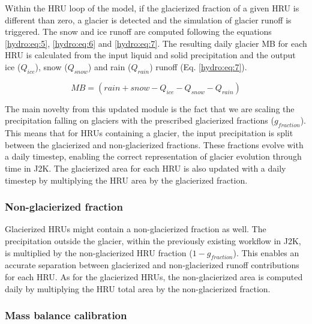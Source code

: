 Within the HRU loop of the model, if the glacierized fraction of a given HRU is different than zero, a glacier is detected and the simulation of glacier runoff is triggered. The snow and ice runoff are computed following the equations \ref{hydro:eq:5}, \ref{hydro:eq:6} and \ref{hydro:eq:7}. The resulting daily glacier MB for each HRU is calculated from the input liquid and solid precipitation and the output ice ($Q_{ice}$), snow ($Q_{snow}$) and rain ($Q_{rain}$) runoff (Eq. \ref{hydro:eq:7}).

\begin{equation} \label{hydro:eq:7}
MB = (rain + snow - Q_{ice} - Q_{snow} - Q_{rain}) 
\end{equation} 

The main novelty from this updated module is the fact that we are scaling the precipitation falling on glaciers with the prescribed glacierized fractions ($g_{fraction}$). This means that for HRUs containing a glacier, the input precipitation is split between the glacierized and non-glacierized fractions. These fractions evolve with a daily timestep, enabling the correct representation of glacier evolution through time in J2K. The glacierized area for each HRU is also updated with a daily timestep by multiplying the HRU area by the glacierized fraction.

\subsubsection{Non-glacierized fraction}

Glacierized HRUs might contain a non-glacierized fraction as well. The precipitation outside the glacier, within the previously existing workflow in J2K, is multiplied by the non-glacierized HRU fraction ($1 - g_{fraction}$). This enables an accurate separation between glacierized and non-glacierized runoff contributions for each HRU. As for the glacierized HRUs, the non-glacierized area is computed daily by multiplying the HRU total area by the non-glacierized fraction.

\subsubsection{Mass balance calibration}

